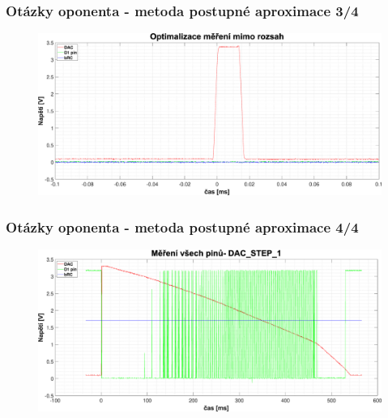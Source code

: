 \documentclass[%
  12pt,       				%
	t,                  %
	aspectratio=1610,   %
	unicode,						%
]{beamer}				    	%
\begin{document}
\begin{frame} 
	\frametitle{Otázky oponenta - metoda postupné aproximace 3/4}
	\vspace*{0.5cm}
	\begin{figure}[ht!]
		\centering
		\includegraphics[width = \textwidth]{obrazky/matlab_generated/pin_out_of_range_opt.eps}
	\end{figure}
\end{frame}


\begin{frame} 
	\frametitle{Otázky oponenta - metoda postupné aproximace 4/4}
	\vspace*{0.5cm}
	\begin{figure}[ht!]
		\centering
		\includegraphics[width = \textwidth]{obrazky/matlab_generated/all_pins.eps}
	\end{figure}
\end{frame}
\end{document}
